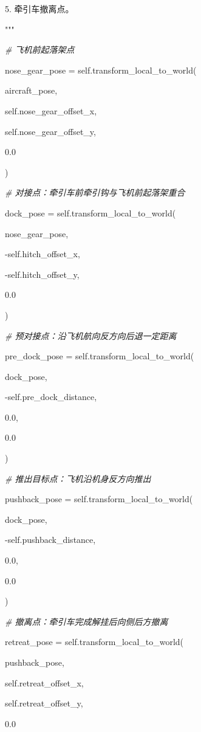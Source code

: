         5. 牵引车撤离点。

        """

        \emph{\# 飞机前起落架点}

        nose\_gear\_pose = self.transform\_local\_to\_world(

            aircraft\_pose,

            self.nose\_gear\_offset\_x,

            self.nose\_gear\_offset\_y,

            0.0

        )

        \emph{\# 对接点：牵引车前牵引钩与飞机前起落架重合}

        dock\_pose = self.transform\_local\_to\_world(

            nose\_gear\_pose,

            -self.hitch\_offset\_x,

            -self.hitch\_offset\_y,

            0.0

        )

        \emph{\# 预对接点：沿飞机航向反方向后退一定距离}

        pre\_dock\_pose = self.transform\_local\_to\_world(

            dock\_pose,

            -self.pre\_dock\_distance,

            0.0,

            0.0

        )

        \emph{\# 推出目标点：飞机沿机身反方向推出}

        pushback\_pose = self.transform\_local\_to\_world(

            dock\_pose,

            -self.pushback\_distance,

            0.0,

            0.0

        )

        \emph{\# 撤离点：牵引车完成解挂后向侧后方撤离}

        retreat\_pose = self.transform\_local\_to\_world(

            pushback\_pose,

            self.retreat\_offset\_x,

            self.retreat\_offset\_y,

            0.0

